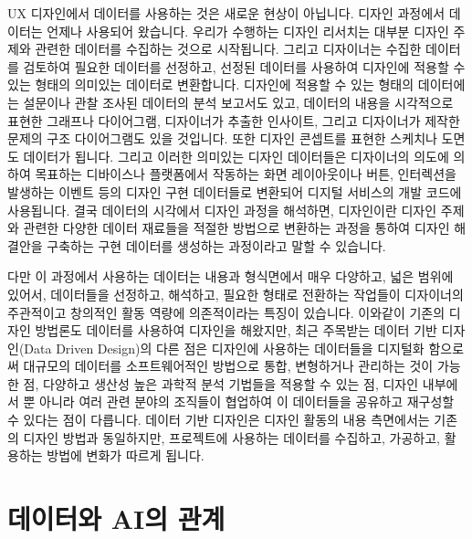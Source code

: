 \documentclass[
  letterpaper,
]{book}
\begin{document}
UX 디자인에서 데이터를 사용하는 것은 새로운 현상이 아닙니다. 디자인
과정에서 데이터는 언제나 사용되어 왔습니다. 우리가 수행하는 디자인
리서치는 대부분 디자인 주제와 관련한 데이터를 수집하는 것으로
시작됩니다. 그리고 디자이너는 수집한 데이터를 검토하여 필요한 데이터를
선정하고, 선정된 데이터를 사용하여 디자인에 적용할 수 있는 형태의
의미있는 데이터로 변환합니다. 디자인에 적용할 수 있는 형태의 데이터에는
설문이나 관찰 조사된 데이터의 분석 보고서도 있고, 데이터의 내용을
시각적으로 표현한 그래프나 다이어그램, 디자이너가 추출한 인사이트,
그리고 디자이너가 제작한 문제의 구조 다이어그램도 있을 것입니다. 또한
디자인 콘셉트를 표현한 스케치나 도면도 데이터가 됩니다. 그리고 이러한
의미있는 디자인 데이터들은 디자이너의 의도에 의하여 목표하는 디바이스나
플랫폼에서 작동하는 화면 레이아웃이나 버튼, 인터렉션을 발생하는 이벤트
등의 디자인 구현 데이터들로 변환되어 디지털 서비스의 개발 코드에
사용됩니다. 결국 데이터의 시각에서 디자인 과정을 해석하면, 디자인이란
디자인 주제와 관련한 다양한 데이터 재료들을 적절한 방법으로 변환하는
과정을 통하여 디자인 해결안을 구축하는 구현 데이터를 생성하는 과정이라고
말할 수 있습니다.

다만 이 과정에서 사용하는 데이터는 내용과 형식면에서 매우 다양하고, 넓은
범위에 있어서, 데이터들을 선정하고, 해석하고, 필요한 형태로 전환하는
작업들이 디자이너의 주관적이고 창의적인 활동 역량에 의존적이라는 특징이
있습니다. 이와같이 기존의 디자인 방법론도 데이터를 사용하여 디자인을
해왔지만, 최근 주목받는 데이터 기반 디자인(Data Driven Design)의 다른
점은 디자인에 사용하는 데이터들을 디지털화 함으로써 대규모의 데이터를
소프트웨어적인 방법으로 통합, 변형하거나 관리하는 것이 가능한 점,
다양하고 생산성 높은 과학적 분석 기법들을 적용할 수 있는 점, 디자인
내부에서 뿐 아니라 여러 관련 분야의 조직들이 협업하여 이 데이터들을
공유하고 재구성할 수 있다는 점이 다릅니다. 데이터 기반 디자인은 디자인
활동의 내용 측면에서는 기존의 디자인 방법과 동일하지만, 프로젝트에
사용하는 데이터를 수집하고, 가공하고, 활용하는 방법에 변화가 따르게
됩니다.

\section{데이터와 AI의
관계}\label{uxb370uxc774uxd130uxc640-aiuxc758-uxad00uxacc4}
\end{document}
